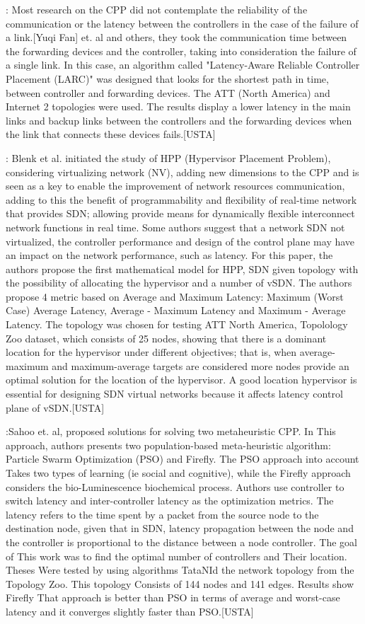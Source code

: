 \documentclass[a4paper,10pt]{article}
\begin{document}
\cite{FaXi18}: Most research on the CPP did not contemplate the reliability of the communication or the latency between the controllers in the case of the failure of a link.[Yuqi Fan] et. al and others, they took the communication time between the forwarding devices and the controller, taking into consideration the failure of a single link.
In this case, an algorithm called "Latency-Aware Reliable Controller Placement (LARC)" was designed that looks for the shortest path in time, between controller and forwarding devices. The ATT (North America) and Internet 2 topologies were used.
The results display a lower latency in the main links and backup links between the controllers and the forwarding devices when the link that connects these devices fails.[USTA]

\cite{BlBa15}: Blenk et al. initiated the study of HPP (Hypervisor Placement Problem), considering virtualizing network (NV), adding new dimensions to the CPP and is seen as a key to enable the improvement of network resources communication, adding to this the benefit of programmability and flexibility of real-time network that provides SDN; allowing provide means for dynamically flexible interconnect network functions in real time. Some authors suggest that a network SDN not virtualized, the controller performance and design of the control plane may have an impact on the network performance, such as latency. For this paper, the authors propose the first mathematical model for HPP, SDN given topology with the possibility of allocating the hypervisor and a number of vSDN. The authors propose 4 metric based on Average and Maximum Latency: Maximum (Worst Case) Average Latency, Average - Maximum Latency and Maximum - Average Latency. The topology was chosen for testing ATT North America, Topolology Zoo dataset, which consists of 25 nodes, showing that there is a dominant location for the hypervisor under different objectives; that is, when average-maximum and maximum-average targets are considered more nodes provide an optimal solution for the location of the hypervisor. A good location hypervisor is essential for designing SDN virtual networks because it affects latency control plane of vSDN.[USTA]

\cite{SaSa17}:Sahoo et. al, proposed solutions for solving two metaheuristic CPP. In This approach, authors presents two population-based meta-heuristic algorithm: Particle Swarm Optimization (PSO) and Firefly. The PSO approach into account Takes two types of learning (ie social and cognitive), while the Firefly approach considers the bio-Luminescence biochemical process. Authors use controller to switch latency and inter-controller latency as the optimization metrics. The latency refers to the time spent by a packet from the source node to the destination node, given that in SDN, latency propagation between the node and the controller is proportional to the distance between a node controller. The goal of This work was to find the optimal number of controllers and Their location. Theses Were tested by using algorithms TataNId the network topology from the Topology Zoo. This topology Consists of 144 nodes and 141 edges. Results show Firefly That approach is better than PSO in terms of average and worst-case latency and it converges slightly faster than PSO.[USTA]
\end{document}
